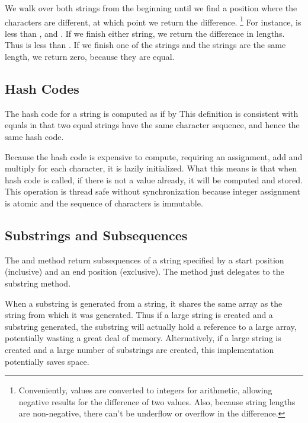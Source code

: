 We walk over both strings from the beginning until we find a position
where the characters are different, at which point we return the
difference.%
%
\footnote{Conveniently,  values are converted to integers
  for arithmetic, allowing negative results for the difference of two
  values.  Also, because string lengths are non-negative, there can't
  be underflow or overflow in the difference.}
%
For instance,  is less than 
, and .  If we finish either string, we
return the difference in lengths.  Thus  is less than
.  If we finish one of the strings and the strings are
the same length, we return zero, because they are equal.

\subsection{Hash Codes}

The hash code for a string  is computed as if by
%
%
This definition is consistent with equals in that two equal strings
have the same character sequence, and hence the same hash code.

Because the hash code is expensive to compute, requiring an
assignment, add and multiply for each character, it is lazily
initialized.  What this means is that when hash code is called, if
there is not a value already, it will be computed and stored. This
operation is thread safe without synchronization because integer
assignment is atomic and the sequence of characters is immutable.

\subsection{Substrings and Subsequences}

The  and method return subsequences of a
string specified by a start position (inclusive) and an end position
(exclusive).  The  method just delegates to
the substring method.

When a substring is generated from a string, it shares the same array
as the string from which it was generated.  Thus if a large string is
created and a substring generated, the substring will actually hold a
reference to a large array, potentially wasting a great deal of
memory.  Alternatively, if a large string is created and a large
number of substrings are created, this implementation potentially
saves space.

